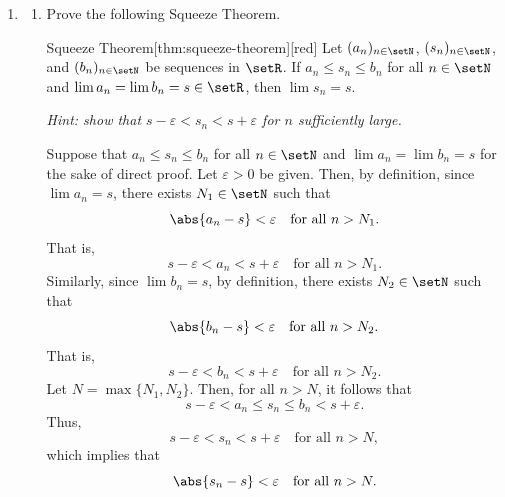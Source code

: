 \begin{enumerate}
\begin{subprove}
    Let \(\varepsilon > 0\) be given and \(N \in \setN\) be \(\ceil{1/\varepsilon}\) where \(N \ge 1/\varepsilon\).
    Then, for all \(n > N\), it follows that
      \[
        s_n > L - \frac{1}{n} > L - \frac{1}{N} \ge L - \varepsilon.
      \]
      Since \(s_n < L\) for all \(n \in \setN\) by definition, it follows that
      \[
        \abs{s_n - L} = L - s_n < \varepsilon \quad\text{for all } n > N.
      \]
    Thus, by definition, \(\lim s_n = L = \sup S\). Therefore, there is an increasing 
    sequence \((s_n)\) of points in \(S\) such that \(\lim s_n = \sup S\).
  \end{subprove}



  \newpage
  \item 
  \begin{enumerate}
    \item Prove the following Squeeze Theorem.
    \begin{define}{Squeeze Theorem}[thm:squeeze-theorem][red]
      Let \((a_n)_{n\in\setN}\), \((s_n)_{n\in\setN}\), and \((b_n)_{n\in\setN}\) be sequences in \(\setR\).
      If \(a_n \leq s_n \leq b_n\) for all \(n \in \setN\) and \(\lim a_n = \lim b_n = s \in \setR\),
      then \(\lim s_n = s\).
    \end{define}
    \textit{Hint: show that \(s - \varepsilon < s_n < s + \varepsilon\) for \(n\) sufficiently large.}
    \begin{subprove}
      Suppose that \(a_n \leq s_n \leq b_n\) for all \(n \in \setN\) and \(\lim a_n = \lim b_n = s\) for the sake of direct proof.
      Let \(\varepsilon > 0\) be given. Then, by definition, since \(\lim a_n = s\),
      there exists \(N_1 \in \setN\) such that
      \[
        \abs{a_n - s} < \varepsilon \quad\text{for all } n > N_1.
      \]
      That is,
      \[
        s - \varepsilon < a_n < s + \varepsilon \quad\text{for all } n > N_1.
      \]
      Similarly, since \(\lim b_n = s\), by definition,
      there exists \(N_2 \in \setN\) such that
      \[
        \abs{b_n - s} < \varepsilon \quad\text{for all } n > N_2.
      \]
      That is,
      \[
        s - \varepsilon < b_n < s + \varepsilon \quad\text{for all } n > N_2.
      \]
      Let \(N = \max\{N_1, N_2\}\). Then, for all \(n > N\), it follows that
      \[
        s - \varepsilon < a_n \leq s_n \leq b_n < s + \varepsilon.
      \]
      Thus,
      \[
        s - \varepsilon < s_n < s + \varepsilon \quad\text{for all } n > N,
      \]
      which implies that
      \[
        \abs{s_n - s} < \varepsilon \quad\text{for all } n > N.
\]
\end{subprove}
\end{enumerate}
\end{enumerate}
